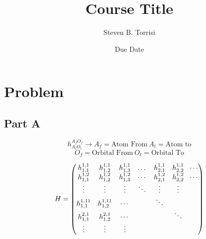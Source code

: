 \documentclass[12pt, oneside]{article}
\numberwithin{equation}{section}
\begin{document}
\pagestyle{fancy} %
\title{ Course Title }
\date{Due Date}
\author{Steven B. Torrisi} 

\maketitle

\section{Problem}

\subsection{Part A}

$$h_{A_{t} O_{t}}^{A_{f} O_{f}} \rightarrow A_f=\text{Atom From} \  A_t=\text{Atom to} $$ 
$$O_f=\text{Orbital From} \ O_t = \text{Orbital To}$$


$$ H = \mqty( 
h_{1,1}^{1,1}      & h^{1,1}_{1,2} &h^{1,1}_{1,3} & \dots & h^{1,1}_{2,1} & h^{1,1}_{2,2} & \dotsi  \\
h_{1,1}^{1,2}      & h^{1,2}_{1,2} &h^{1,2}_{1,3} & \dotsi &h^{1,2}_{2,1} & h^{1,2}_{2,2}  & \dotsi  \\
\vdots                 & \vdots            & \vdots           & \ddots & \vdots          & \vdots           &         \\
h^{1,11}_{1,1}     & h^{1,11}_{1,2}& \dotsi           &	      & \ddots         &		          &      	\\
h^{2,1}_{1,1}      & h^{2,1}_{1,2} & \dotsi             &         &                      & \ddots           &          \\
\vdots                  & \vdots            & \vdots             &        &                     &                      &    ) 
$$
\end{document}
